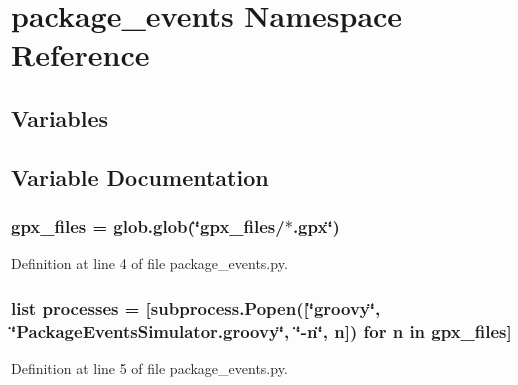\hypertarget{namespacepackage__events}{}\section{package\+\_\+events Namespace Reference}
\label{namespacepackage__events}
\subsection*{Variables}


\subsection{Variable Documentation}
\subsubsection[{\texorpdfstring{gpx\+\_\+files}{gpx_files}}]{\setlength{\rightskip}{0pt plus 5cm}gpx\+\_\+files = glob.\+glob(\char`\"{}gpx\+\_\+files/$\ast$.gpx\char`\"{})}\hypertarget{namespacepackage__events_a962f35982bbdbfcd60bc627b6f5c283a}{}\label{namespacepackage__events_a962f35982bbdbfcd60bc627b6f5c283a}


Definition at line 4 of file package\+\_\+events.\+py.

\subsubsection[{\texorpdfstring{processes}{processes}}]{\setlength{\rightskip}{0pt plus 5cm}list processes = \mbox{[}subprocess.\+Popen(\mbox{[}\char`\"{}groovy\char`\"{}, \char`\"{}Package\+Events\+Simulator.\+groovy\char`\"{}, \char`\"{}-\/{\bf n}\char`\"{}, n\mbox{]}) for {\bf n} in {\bf gpx\+\_\+files}\mbox{]}}\hypertarget{namespacepackage__events_aa17e16eb31b762381c96aa7bfdd6109c}{}\label{namespacepackage__events_aa17e16eb31b762381c96aa7bfdd6109c}


Definition at line 5 of file package\+\_\+events.\+py.

